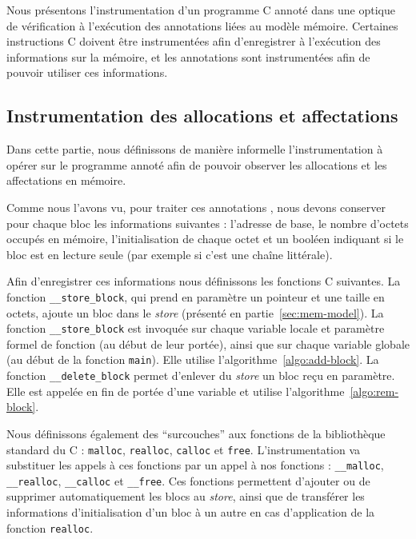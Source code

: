 Nous présentons l'instrumentation d'un programme C annoté dans une optique de
vérification à l'exécution des annotations liées au modèle mémoire.
Certaines instructions C doivent être instrumentées afin d'enregistrer à
l'exécution des informations sur la mémoire, et les annotations sont
instrumentées afin de pouvoir utiliser ces informations.


\subsection{Instrumentation des allocations et affectations}


Dans cette partie, nous définissons de manière informelle l'instrumentation à
opérer sur le programme annoté afin de pouvoir observer les allocations et
les affectations en mémoire.

Comme nous l'avons vu, pour traiter ces annotations \eacsl, nous devons
conserver pour chaque bloc les informations suivantes : l'adresse de base, le
nombre d'octets occupés en mémoire, l'initialisation de chaque octet et un
booléen indiquant si le bloc est en lecture seule (par exemple si c'est une
chaîne littérale).

Afin d'enregistrer ces informations nous définissons les fonctions C suivantes.
La fonction \lstinline'__store_block', qui prend en paramètre un pointeur et une
taille en octets, ajoute un bloc dans le \textit{store} (présenté en
partie~\ref{sec:mem-model}).
La fonction \lstinline'__store_block' est invoquée sur chaque variable locale
et paramètre formel de fonction (au début de leur portée), ainsi que sur chaque
variable globale (au début de la fonction \lstinline'main').
Elle utilise l'algorithme~\ref{algo:add-block}.
La fonction \lstinline'__delete_block' permet d'enlever du \textit{store} un
bloc reçu en paramètre.
Elle est appelée en fin de portée d'une variable et utilise
l'algorithme~\ref{algo:rem-block}.

Nous définissons également des ``surcouches'' aux fonctions de la bibliothèque
standard du C : \lstinline'malloc', \lstinline'realloc', \lstinline'calloc' et
\lstinline'free'.
L'instrumentation va substituer les appels à ces fonctions par un appel à nos
fonctions : \lstinline'__malloc', \lstinline'__realloc', \lstinline'__calloc'
et \lstinline'__free'.
Ces fonctions permettent d'ajouter ou de supprimer automatiquement les blocs
au \textit{store}, ainsi que de transférer les informations d'initialisation
d'un bloc à un autre en cas d'application de la fonction \lstinline'realloc'.

